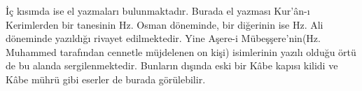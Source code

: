 \indent İç kısımda ise el yazmaları bulunmaktadır. Burada el yazması Kur'ân-ı Kerimlerden bir tanesinin Hz. Osman döneminde, bir diğerinin ise Hz. Ali döneminde yazıldığı rivayet edilmektedir. Yine Aşere-i Mübeşşere'nin(Hz. Muhammed tarafından cennetle müjdelenen on kişi) isimlerinin yazılı olduğu örtü de bu alanda sergilenmektedir. Bunların dışında eski bir Kâbe kapısı kilidi ve Kâbe mührü gibi eserler de burada görülebilir.
\newpage
\begin{figure}[th]
    \centering
    \hfill
\end{figure}
